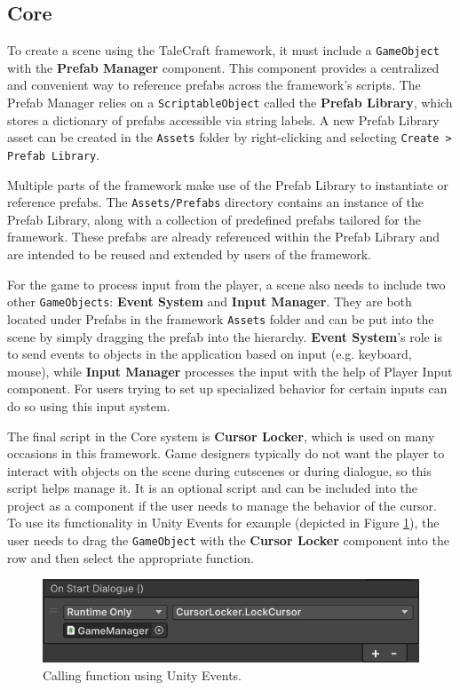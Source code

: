 \subsection{Core}
\label{Manual:Core}
To create a scene using the TaleCraft framework, it must include a \verb|GameObject| with the \textbf{Prefab Manager} component. This component provides a centralized and convenient way to reference prefabs across the framework's scripts. The Prefab Manager relies on a \verb|ScriptableObject| called the \textbf{Prefab Library}, which stores a dictionary of prefabs accessible via string labels. A new Prefab Library asset can be created in the \verb|Assets| folder by right-clicking and selecting \verb|Create > Prefab Library|.

Multiple parts of the framework make use of the Prefab Library to instantiate or reference prefabs. The \verb|Assets/Prefabs| directory contains an instance of the Prefab Library, along with a collection of predefined prefabs tailored for the framework. These prefabs are already referenced within the Prefab Library and are intended to be reused and extended by users of the framework.

For the game to process input from the player, a scene also needs to include two other \verb|GameObjects|: \textbf{Event System} and \textbf{Input Manager}. They are both located under Prefabs in the framework \verb|Assets| folder and can be put into the scene by simply dragging the prefab into the hierarchy. \textbf{Event System}'s role is to send events to objects in the application based on input (e.g. keyboard, mouse), while \textbf{Input Manager} processes the input with the help of Player Input component. For users trying to set up specialized behavior for certain inputs can do so using this input system.

The final script in the Core system is \textbf{Cursor Locker}, which is used on many occasions in this framework. Game designers typically do not want the player to interact with objects on the scene during cutscenes or during dialogue, so this script helps manage it. It is an optional script and can be included into the project as a component if the user needs to manage the behavior of the cursor. To use its functionality in Unity Events for example (depicted in Figure \ref{fig:Manual-UnityEvents}), the user needs to drag the \verb|GameObject| with the \textbf{Cursor Locker} component into the row and then select the appropriate function.


\begin{figure}[H]
\centering
\includegraphics[width=0.7\linewidth]{img/User doc/image_2025-07-09_124713377.png}
\caption{Calling function using Unity Events.}
\label{fig:Manual-UnityEvents}
\end{figure}


